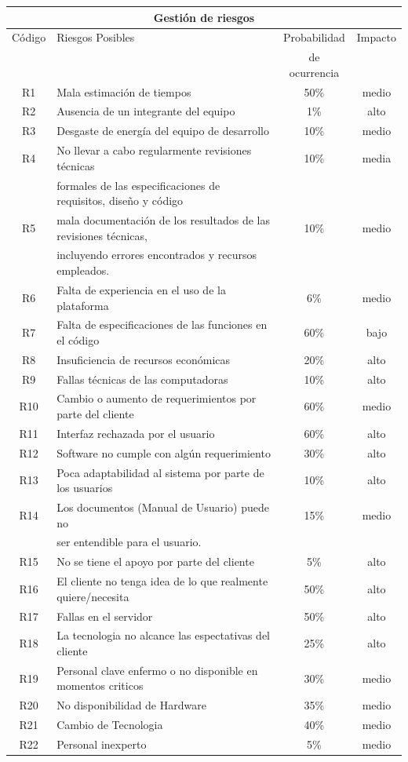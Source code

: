 \documentclass[11pt,letterpaper]{report}
\begin{document}
\begin{tabular}{|c|l|c|c|}
	\hline
	\multicolumn{4}{|c|}{Gestión de riesgos}\\ \hline
	Código & Riesgos Posibles & Probabilidad & Impacto \\ 
	& & de ocurrencia & \\ \hline
	R1 & Mala estimación de tiempos  & 50\% & medio \\ \hline
	R2 & Ausencia de un integrante del equipo & 1\% & alto \\ \hline
	R3 & Desgaste de energía del equipo de desarrollo & 10\% & medio  \\ \hline
	R4 & No llevar a cabo regularmente revisiones técnicas  & 10\% & media \\ 
	& formales de las especificaciones de requisitos, diseño y código & & \\ \hline
	R5 & mala documentación de los resultados de las revisiones técnicas,  & 10\% & medio \\ 
	& incluyendo errores encontrados y recursos empleados. && \\ \hline
	R6 & Falta de experiencia en el uso de la plataforma & 6\% & medio \\ \hline
	R7 & Falta de especificaciones de las funciones en el código & 60\% & bajo \\ \hline
	R8 & Insuficiencia de recursos económicas & 20\% & alto \\ \hline
	R9 & Fallas técnicas de las computadoras & 10\% & alto \\ \hline
	R10 & Cambio o aumento de requerimientos por parte del cliente & 60\% & medio \\ \hline
	R11 & Interfaz rechazada por el usuario & 60\% & alto \\ \hline
	R12 & Software no cumple con algún requerimiento & 30\% & alto \\ \hline
	R13 & Poca adaptabilidad al sistema por parte de los usuarios & 10\% & alto  \\ \hline
	R14 & Los documentos (Manual de Usuario) puede no  & 15\% & medio \\ 
	& ser entendible para el usuario. && \\ \hline
	R15 & No se tiene el apoyo por parte del cliente & 5\% & alto \\ \hline
	R16 & El cliente no tenga idea de lo que realmente quiere/necesita & 50\% & alto \\ \hline
	R17 & Fallas en el servidor & 50\% & alto \\ \hline
	R18 & La tecnologia no alcance las espectativas del cliente & 25\% & alto \\ \hline
	R19 & Personal clave enfermo o no disponible en momentos criticos & 30\% & medio \\ \hline
	R20 & No disponibilidad de Hardware & 35\% & medio \\ \hline
	R21 & Cambio de Tecnologia & 40\% & medio \\ \hline
	R22 & Personal inexperto & 5\% & medio \\ \hline
\end{tabular}
\end{document}
